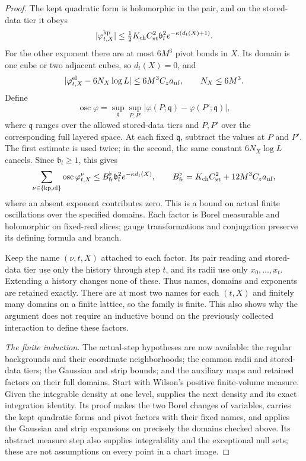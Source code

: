 \documentclass[11pt,letterpaper,reqno]{amsart}
\theoremstyle{definition}
\theoremstyle{remark}
\begin{document}
\begin{proof}
The kept quadratic form is holomorphic in the pair, and
on the stored-data tier it obeys
\[
 |\varphi^{\rm kp}_{t,X}|
 \le\tfrac12K_{\rm ch}C_{\rm xt}^2\mathfrak b_l^2
                         e^{-\kappa(d_t(X)+1)}.
\]
For the other exponent there are at most $6M^3$ pivot
bonds in $X$. Its domain is one cube or two adjacent
cubes, so $d_t(X)=0$, and
\[
 |\varphi^{\rm el}_{t,X}-6N_X\log L|
                         \le6M^3C_za_{\rm nf},
 \qquad N_X\le6M^3.
\]
Define
\[
 \operatorname{osc}\varphi
   =\sup_{\mathfrak q}\sup_{P,P'}
       |\varphi(P;\mathfrak q)-\varphi(P';\mathfrak q)|,
\]
where $\mathfrak q$ ranges over the allowed stored-data tiers
and $P,P'$ over the corresponding full layered space.
At each fixed $\mathfrak q$, subtract the values at $P$ and $P'$. The first estimate is used
twice; in the second, the same constant $6N_X\log L$
cancels. Since $\mathfrak b_l\ge1$, this gives
\[
 \sum_{\nu\in\{{\rm kp},{\rm el}\}}
        \operatorname{osc}\varphi^\nu_{t,X}
 \le B_{\rm fr}^{\flat}\mathfrak b_l^2e^{-\kappa d_t(X)},
 \qquad
 B_{\rm fr}^{\flat}
       =K_{\rm ch}C_{\rm xt}^2+12M^3C_za_{\rm nf},
\]
where an absent exponent contributes zero. This is a
bound on actual finite oscillations over the specified
domains. Each factor is Borel measurable and holomorphic
on fixed-real slices; gauge transformations and conjugation
preserve its defining formula and branch.

Keep the name $(\nu,t,X)$ attached to each factor.
Its pair reading and stored-data tier use only the history
through step $t$, and its radii use only $x_0,\ldots,x_t$.
Extending a history changes none of these. Thus names,
domains and exponents are retained exactly. There are at
most two names for each $(t,X)$ and finitely many domains
on a finite lattice, so the family is finite. This also
shows why the argument does not require an inductive bound
on the previously collected interaction to define these
factors.

\emph{The finite induction.}
The actual-step hypotheses are now available: the regular
backgrounds and their coordinate neighborhoods; the common
radii and stored-data tiers; the Gaussian and strip bounds;
and the auxiliary maps and retained factors on their full
domains. Start with Wilson's positive finite-volume
measure. Given the integrable density at one level,
\cite[Prop.~4.165]{YMM1} supplies the next density and its
exact integration identity. Its proof makes the two Borel
changes of variables, carries the kept quadratic forms
and pivot factors with their fixed names, and applies the
Gaussian and strip expansions on precisely the domains
checked above. Its abstract measure step also supplies
integrability and the exceptional null sets; these are
not assumptions on every point in a chart image.


\end{proof}
\end{document}
